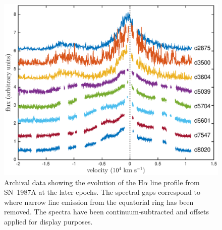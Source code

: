 \documentclass[useAMS,usenatbib,usegraphicx]{mnras}
\begin{document}

\begin{figure}
\includegraphics[trim =45 10 45 15,clip=true,scale=0.51]{Ha_evol_late_1col}
\caption{Archival data showing the evolution of the H$\alpha$
line profile from SN~1987A at the later epochs. The spectral gaps 
correspond to where narrow line emission from the equatorial ring has been 
removed. The spectra have been continuum-subtracted and offsets applied 
for display purposes.}
\label{Ha_evol_late}
\end{figure}

\end{document}
